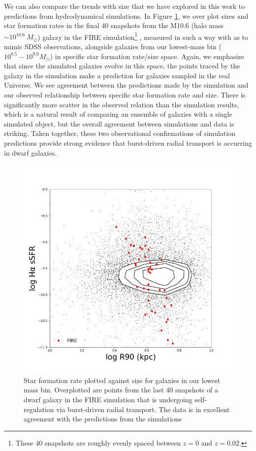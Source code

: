 \documentclass[iop]{emulateapj}
\begin{document}
We can also compare the trends with size that we have explored in this work to predictions from hydrodynamical simulations. In Figure \ref{fig:predict}, we over plot sizes and star formation rates in the final 40 snapshots from the M10.6 (halo mass $\sim 10^{10.6} \  M_{\odot}$) galaxy in the FIRE simulation\footnote{These 40 snapshots are roughly evenly spaced between $z=0$ and $z=0.02$.} \citep{EB17}, measured in such a way with as to mimic SDSS observations, alongside galaxies from our lowest-mass bin ($10^{8.5}-10^{9.0} M_{\odot}$) in specific star formation rate/size space. Again, we emphasize that since the simulated galaxies evolve in this space, the points traced by the galaxy in the simulation make a prediction for galaxies sampled in the real Universe. We see agreement between the predictions made by the simulation and our observed relationship between specific star formation rate and size. There is significantly more scatter in the observed relation than the simulation results, which is a natural result of comparing an ensemble of galaxies with a single simulated object, but the overall agreement between simulations and data is striking. Taken together, these two observational confirmations of simulation predictions provide strong evidence that burst-driven radial transport is occurring in dwarf galaxies.



\begin{figure}
	\centering
	\includegraphics[width=1.5 \columnwidth]{111_dwarf_8_5_size_SF_r.png}
	\caption{Star formation rate plotted against size for galaxies in our lowest mass bin. Overplotted are points from the last 40 snapshots of a dwarf galaxy in the FIRE simulation that is undergoing self-regulation via burst-driven radial transport. The data is in excellent agreement with the predictions from the simulations}
	\label{fig:predict}
	
\end{figure}
\end{document}

